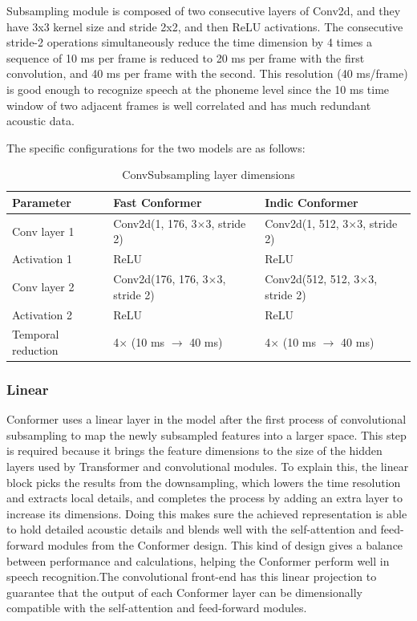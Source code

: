 Subsampling module is composed of two consecutive layers of Conv2d, and they have 3x3 kernel size and stride 2x2, and then ReLU activations. The consecutive stride-2 operations simultaneously reduce the time dimension by 4 times a sequence of 10 ms per frame is reduced to 20 ms per frame with the first convolution, and 40 ms per frame with the second. This resolution (40 ms/frame) is good enough to recognize speech at the phoneme level since the 10 ms time window of two adjacent frames is well correlated and has much redundant acoustic data.

The specific configurations for the two models are as follows:

\begin{table}[H]
\caption{ConvSubsampling layer dimensions}
\label{tab:convsubsampling_dimensions}
\centering
\begin{tabularx}{\textwidth}{|l|X|X|}
\hline
\textbf{Parameter} & \textbf{Fast Conformer} & \textbf{Indic Conformer} \\
\hline
Conv layer 1 & Conv2d(1, 176, 3$\times$3, stride 2) & Conv2d(1, 512, 3$\times$3, stride 2) \\
Activation 1 & ReLU & ReLU \\
Conv layer 2 & Conv2d(176, 176, 3$\times$3, stride 2) & Conv2d(512, 512, 3$\times$3, stride 2) \\
Activation 2 & ReLU & ReLU \\
Temporal reduction & 4$\times$ (10 ms $\to$ 40 ms) & 4$\times$ (10 ms $\to$ 40 ms) \\
\hline
\end{tabularx}
\end{table}

\subsubsection{Linear}

Conformer uses a linear layer in the model after the first process of convolutional subsampling to map the newly subsampled features into a larger space. This step is required because it brings the feature dimensions to the size of the hidden layers used by Transformer and convolutional modules. To explain this, the linear block picks the results from the downsampling, which lowers the time resolution and extracts local details, and completes the process by adding an extra layer to increase its dimensions. Doing this makes sure the achieved representation is able to hold detailed acoustic details and blends well with the self-attention and feed-forward modules from the Conformer design. This kind of design gives a balance between performance and calculations, helping the Conformer perform well in speech recognition.The convolutional front-end has this linear projection to guarantee that the output of each Conformer layer can be dimensionally compatible with the self-attention and feed-forward modules.

